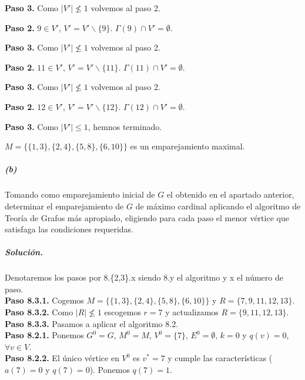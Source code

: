 \documentclass[12pt, oneside, a4paper]{article}
\begin{document}
{\bf Paso 3.} Como $|V'|\not\leq 1$
volvemos al paso 2.

{\bf Paso 2.} $9\in V'$, $V'=V'\backslash
\{9\}$. $\Gamma(9)\cap
V'=\emptyset$.

{\bf Paso 3.} Como $|V'|\not\leq 1$
volvemos al paso 2.

{\bf Paso 2.} $11\in V'$, $V'=V'\backslash
\{11\}$. $\Gamma(11)\cap
V'=\emptyset$.

{\bf Paso 3.} Como $|V'|\not\leq 1$
volvemos al paso 2.

{\bf Paso 2.} $12\in V'$, $V'=V'\backslash
\{12\}$. $\Gamma(12)\cap
V'=\emptyset$.

{\bf Paso 3.} Como $|V'|\leq 1$,
hemnos terminado.

$M=\{\{1,3\},\{2,4\},\{5,8\},\{6,10\}\}$
es un emparejamiento maximal.

\subparagraph{(b)} Tomando como emparejamiento inicial de $G$ el obtenido en el
apartado anterior, determinar el emparejamiento de $G$ de máximo
cardinal aplicando el algoritmo de Teoría de Grafos más apropiado,
eligiendo para cada paso el menor vértice que satisfaga las
condiciones requeridas.

\subparagraph{Solución.\\}

Denotaremos los pasos por 8.\{2,3\}.x siendo 8.y el algoritmo y x el
número de paso.\\

{\bf Paso 8.3.1.} Cogemos $M=\{\{1,3\},\{2,4\},\{5,8\},\{6,10\}\}$ y $R=\{7, 9, 11, 12, 13\}$.\\

{\bf Paso 8.3.2.} Como $|R|\not\leq 1$ escogemos $r=7$ y actualizamos
$R=\{9, 11, 12, 13\}$.\\

{\bf Paso 8.3.3.} Pasamos a aplicar el algoritmo 8.2.\\

{\bf Paso 8.2.1.} Ponemos $G^{0}=G$, $M^{0}=M$, $V^{0}=\{7\}$,
$E^{0}=\emptyset$, $k=0$ y $q(v)=0$, $\forall v\in V$.\\

{\bf Paso 8.2.2.} El único vértice en $V^{0}$ es $v^{*}=7$ y cumple las
características ($a(7)=0$ y $q(7)=0$). Ponemos $q(7)=1$.\\
\end{document}
